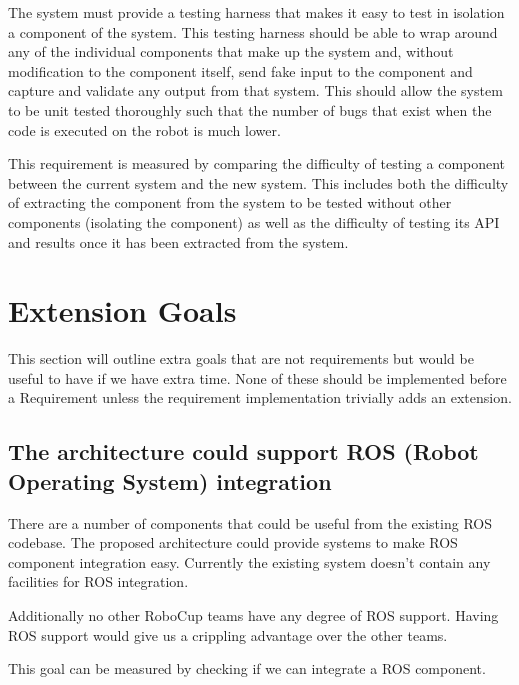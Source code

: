 \documentclass[english,12pt]{scrartcl}
\begin{document}
			The system must provide a testing harness that makes it easy to test in isolation a
			component of the system. This testing harness should be able to wrap around any of the
			individual components that make up the system and, without modification to the component
			itself, send fake input to the component and capture and validate any output from that
			system. This should allow the system to be unit tested thoroughly such that the number
			of bugs that exist when the code is executed on the robot is much lower.

			This requirement is measured by comparing the difficulty of testing a component between
			the current system and the new system. This includes both the difficulty of extracting
			the component from the system to be tested without other components (isolating the
			component) as well as the difficulty of testing its API and results once it has been
			extracted from the system.

	\section{Extension Goals}
		This section will outline extra goals that are not requirements but would be useful to have
		if we have extra time. None of these should be implemented before a Requirement unless the
		requirement implementation trivially adds an extension.

		\subsection{The architecture could support ROS (Robot Operating System) integration}
			There are a number of components that could be useful from the existing ROS codebase.
			The proposed architecture could provide systems to make ROS component integration easy.
			Currently the existing system doesn't contain any facilities for ROS integration.

			Additionally no other RoboCup teams have any degree of ROS support. Having ROS support
			would give us a crippling advantage over the other teams.

			This goal can be measured by checking if we can integrate a ROS component.


	
	
\end{document}
